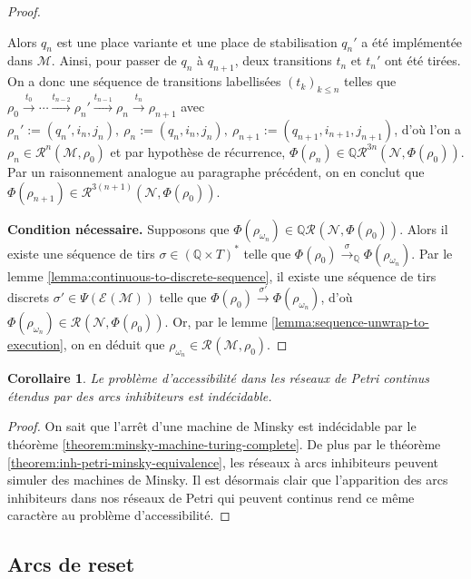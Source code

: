 \documentclass{article}
\newtheorem{corollary}{Corollaire}
\theoremstyle{remark}
\theoremstyle{remark}
\newcommand{\reach}[3][]{\mathcal{R}^{#1}(\mathcal{#2}, #3)}
\newcommand{\creach}[3][]{\mathbb{Q}\reach[#1]{#2}{#3}}
\newcommand{\reaches}[1][]{\xrightarrow{#1}}
\newcommand{\creaches}[1][]{\reaches[#1]_{\mathbb{Q}}}
\newcommand{\runs}[2][]{\mathcal{E}^{#1}(\mathcal{#2})}
\begin{document}
\begin{proof}
{\begin{itemize}
            Alors $q_n$ est une place variante et une place de stabilisation $q_n'$ a été implémentée dans $\mathcal{M}$.
            Ainsi, pour passer de $q_n$ à $q_{n+1}$, deux transitions $t_n$ et $t_n'$ ont été tirées.
            On a donc une séquence de transitions labellisées $(t_k)_{k \leq n}$ telles que $\rho_0 \reaches[t_0] \cdots \reaches[t_{n-2}] \rho_n' \reaches[t_{n-1}] \rho_n \reaches[t_n] \rho_{n+1}$ avec $\rho_n' := (q_n', i_n, j_n),\ \rho_n := (q_n, i_n, j_n),\ \rho_{n+1} := (q_{n+1}, i_{n+1}, j_{n+1})$, d'où l'on a $\rho_n \in \reach[n]{M}{\rho_0}$ et par hypothèse de récurrence, $\Phi(\rho_n) \in \creach[3n]{N}{\Phi(\rho_0)}$.
            Par un raisonnement analogue au paragraphe précédent, on en conclut que $\Phi(\rho_{n+1}) \in \reach[3(n+1)]{N}{\Phi(\rho_0)}$.
        \end{itemize}
        \textbf{Condition nécessaire.} Supposons que $\Phi(\rho_{\omega_n}) \in \creach{N}{\Phi(\rho_0)}$.
        Alors il existe une séquence de tirs $\sigma \in (\mathbb{Q} \times T)^*$ telle que $\Phi(\rho_0) \creaches[\sigma] \Phi(\rho_{\omega_n})$.
        Par le lemme \ref{lemma:continuous-to-discrete-sequence}, il existe une séquence de tirs discrets $\sigma' \in \Psi(\runs{M})$ telle que $\Phi(\rho_0) \reaches[\sigma'] \Phi(\rho_{\omega_n})$, d'où $\Phi(\rho_{\omega_n}) \in \reach{N}{\Phi(\rho_0)}$.
        Or, par le lemme \ref{lemma:sequence-unwrap-to-execution}, on en déduit que $\rho_{\omega_n} \in \reach{M}{\rho_0}$.
    }
\end{proof}

\begin{corollary}
    \label{corollary:inhibitor-cepn-undecidable}
    Le problème d'accessibilité dans les réseaux de Petri continus étendus par des arcs inhibiteurs est indécidable.
\end{corollary}

\begin{proof}
    On sait que l'arrêt d'une machine de Minsky est indécidable par le théorème \ref{theorem:minsky-machine-turing-complete}. De plus par le théorème \ref{theorem:inh-petri-minsky-equivalence}, les réseaux à arcs inhibiteurs peuvent simuler des machines de Minsky. Il est désormais clair que l'apparition des arcs inhibiteurs dans nos réseaux de Petri qui peuvent continus rend ce même caractère au problème d'accessibilité.
\end{proof}

\subsection{Arcs de reset}
\end{document}
